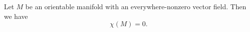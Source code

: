 Let $M$ be an orientable manifold with an everywhere-nonzero vector field. Then we have
$$\chi(M) = 0.$$
